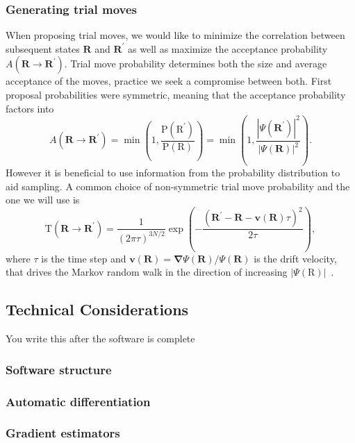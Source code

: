 \documentclass[final,3p,times,twocolumn]{elsarticle}
\begin{document}
	\subsubsection{Generating trial moves}
	When proposing trial moves, we would like to minimize the correlation between subsequent states $\mathbf{R}$ and $\mathbf{R}^\prime$ as well as maximize the acceptance probability $A(\mathbf{R} \rightarrow \mathbf{R}^{\prime})$. Trial move probability determines both the size and average acceptance of the moves, practice we seek a compromise between both. First proposal probabilities were symmetric, meaning that the acceptance probability factors into
	\begin{equation}
		A\left(\mathbf{R} \rightarrow \mathbf{R}^{\prime}\right)=\min \left(1, \frac{\mathrm{P}(\mathrm{R}^{\prime})}{\mathrm{P}(\mathrm{R})}\right) = \min\left(1, \frac{|\Psi(\mathbf{R}^\prime)|^2}{|\Psi(\mathbf{R})|^2}\right).
	\end{equation}
	However it is beneficial to use information from the probability distribution to aid sampling. A common choice of non-symmetric trial move probability and the one we will use is 
	\begin{equation}
		\mathrm{T}\left(\mathbf{R} \rightarrow \mathbf{R}^{\prime}\right) = \frac{1}{(2 \pi \tau)^{3 N / 2}}\exp\left({-} \frac{\left(\mathbf{R}^{\prime}-\mathbf{R}-\mathbf{v}\left(\mathbf{R}\right) \tau\right)^{2}}{2 \tau}\right),
	\end{equation}
	where $\tau$ is the time step and $\mathbf{v}(\mathbf{R})=\boldsymbol{\nabla} \Psi(\mathbf{R}) / \Psi(\mathbf{R})$ is the drift velocity, that drives the Markov random walk in the direction of increasing $|\Psi(\mathrm{R})|$~\cite{gubernatis_kawashima_werner_2016}.
	
	\subsection{Technical Considerations}
	You write this after the software is complete
	
	\subsubsection{Software structure}
	\subsubsection{Automatic differentiation}
	\subsubsection{Gradient estimators}
\end{document}
